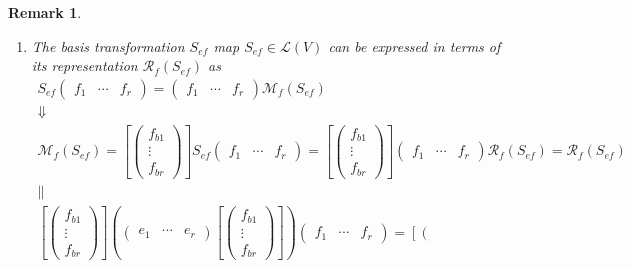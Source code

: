 \documentclass[aps,preprint]{revtex4}
\newtheorem{remark}[theorem]{Remark}
\begin{document}
\begin{remark}
\begin{enumerate}
\begin{enumerate}
\item The basis transformation $S_{ef}$ map $S_{ef}\in \mathcal{L}\left(
V\right) $ can be expressed in terms of its representation $\mathcal{R}%
_{f}\left( S_{ef}\right) $ as 
\begin{gather}
S_{ef}\left( 
\begin{array}{ccc}
f_{1} & \cdots & f_{r}%
\end{array}%
\right) =\left( 
\begin{array}{ccc}
f_{1} & \cdots & f_{r}%
\end{array}%
\right) \mathcal{M}_{f}\left( S_{ef}\right) \\
\Downarrow \\
\mathcal{M}_{f}\left( S_{ef}\right) =\left[ \left( 
\begin{array}{c}
f_{b1} \\ 
\vdots \\ 
f_{br}%
\end{array}%
\right) \right] S_{ef}\left( 
\begin{array}{ccc}
f_{1} & \cdots & f_{r}%
\end{array}%
\right) =\left[ \left( 
\begin{array}{c}
f_{b1} \\ 
\vdots \\ 
f_{br}%
\end{array}%
\right) \right] \left( 
\begin{array}{ccc}
f_{1} & \cdots & f_{r}%
\end{array}%
\right) \mathcal{R}_{f}\left( S_{ef}\right) =\mathcal{R}_{f}\left(
S_{ef}\right) \\
\parallel \\
\left[ \left( 
\begin{array}{c}
f_{b1} \\ 
\vdots \\ 
f_{br}%
\end{array}%
\right) \right] \left( \left( 
\begin{array}{ccc}
e_{1} & \cdots & e_{r}%
\end{array}%
\right) \left[ \left( 
\begin{array}{c}
f_{b1} \\ 
\vdots \\ 
f_{br}%
\end{array}%
\right) \right] \right) \left( 
\begin{array}{ccc}
f_{1} & \cdots & f_{r}%
\end{array}%
\right) =\left[ \left( 
\begin{array}{c}

\end{array}
\end{gather}
\end{enumerate}
\end{enumerate}
\end{remark}
\end{document}
